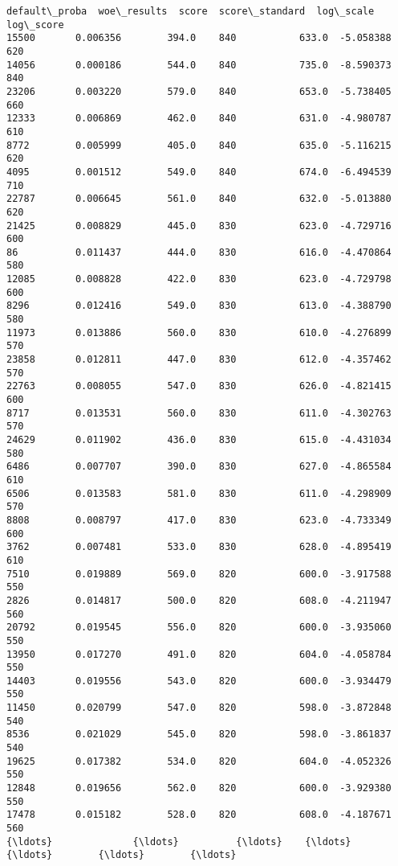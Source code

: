 \documentclass[11pt]{article}
\begin{document}
    \begin{Verbatim}[commandchars=\\\{\}]
       default\_proba  woe\_results  score  score\_standard  log\_scale  log\_score
15500       0.006356        394.0    840           633.0  -5.058388        620
14056       0.000186        544.0    840           735.0  -8.590373        840
23206       0.003220        579.0    840           653.0  -5.738405        660
12333       0.006869        462.0    840           631.0  -4.980787        610
8772        0.005999        405.0    840           635.0  -5.116215        620
4095        0.001512        549.0    840           674.0  -6.494539        710
22787       0.006645        561.0    840           632.0  -5.013880        620
21425       0.008829        445.0    830           623.0  -4.729716        600
86          0.011437        444.0    830           616.0  -4.470864        580
12085       0.008828        422.0    830           623.0  -4.729798        600
8296        0.012416        549.0    830           613.0  -4.388790        580
11973       0.013886        560.0    830           610.0  -4.276899        570
23858       0.012811        447.0    830           612.0  -4.357462        570
22763       0.008055        547.0    830           626.0  -4.821415        600
8717        0.013531        560.0    830           611.0  -4.302763        570
24629       0.011902        436.0    830           615.0  -4.431034        580
6486        0.007707        390.0    830           627.0  -4.865584        610
6506        0.013583        581.0    830           611.0  -4.298909        570
8808        0.008797        417.0    830           623.0  -4.733349        600
3762        0.007481        533.0    830           628.0  -4.895419        610
7510        0.019889        569.0    820           600.0  -3.917588        550
2826        0.014817        500.0    820           608.0  -4.211947        560
20792       0.019545        556.0    820           600.0  -3.935060        550
13950       0.017270        491.0    820           604.0  -4.058784        550
14403       0.019556        543.0    820           600.0  -3.934479        550
11450       0.020799        547.0    820           598.0  -3.872848        540
8536        0.021029        545.0    820           598.0  -3.861837        540
19625       0.017382        534.0    820           604.0  -4.052326        550
12848       0.019656        562.0    820           600.0  -3.929380        550
17478       0.015182        528.0    820           608.0  -4.187671        560
{\ldots}              {\ldots}          {\ldots}    {\ldots}             {\ldots}        {\ldots}        {\ldots}

\end{Verbatim}
\end{document}
